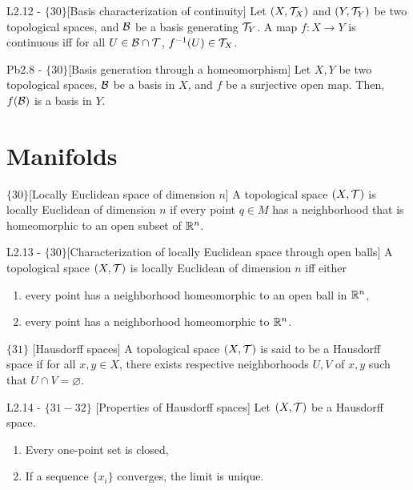 \documentclass{article}
\begin{document}
\begin{flexilemma}{L2.12 - $\{30\}$}[Basis characterization of continuity]
    Let $(X,\mathcal{T}_X)$ and $(Y,\mathcal{T}_Y)$ be two topological spaces, and $\mathcal{B}$ be a basis generating $\mathcal{T}_Y$. A map $f : X \to Y$ is continuous iff for all $U \in \mathcal{B} \cap \mathcal{T}$, $f^{-1}(U) \in \mathcal{T}_X$.
\end{flexilemma}

\begin{flexilemma}{Pb2.8 - $\{30\}$}[Basis generation through a homeomorphism]
    Let $X,Y$ be two topological spaces, $\mathcal{B}$ be a basis in $X$, and $f$ be a surjective open map. Then, $f(\mathcal{B})$ is a basis in $Y$.
\end{flexilemma}

\section{Manifolds}

\begin{flexidefinition}{$\{30\}$}[Locally Euclidean space of dimension $n$]
    A topological space $(X,\mathcal{T})$ is locally Euclidean of dimension $n$ if every point $q \in M$ has a neighborhood that is homeomorphic to an open subset of $\mathbb{R}^n$.
\end{flexidefinition}

\begin{flexilemma} {L2.13 - $\{30\}$}[Characterization of locally Euclidean space through open balls]
    A topological space $(X,\mathcal{T})$ is locally Euclidean of dimension $n$ iff either 
    \begin{enumerate}
        \item every point has a neighborhood homeomorphic to an open ball in $\mathbb{R}^n$,
        \item every point has a neighborhood homeomorphic to $\mathbb{R}^n$.
    \end{enumerate}
\end{flexilemma}

\begin{flexidefinition} {$\{31\}$} [Hausdorff spaces]
    A topological space $(X,\mathcal{T})$ is said to be a Hausdorff space if for all $x,y \in X$, there exists respective neighborhoods $U,V$ of $x,y$ such that $U\cap V = \varnothing$.
\end{flexidefinition}

\begin{flexilemma} {L2.14 - $\{31-32\}$} [Properties of Hausdorff spaces] Let $(X,\mathcal{T})$ be a Hausdorff space.
    \begin{enumerate}
        \item Every one-point set is closed,
        \item If a sequence $\{x_i\}$ converges, the limit is unique.
    \end{enumerate}
\end{flexilemma}
\end{document}

